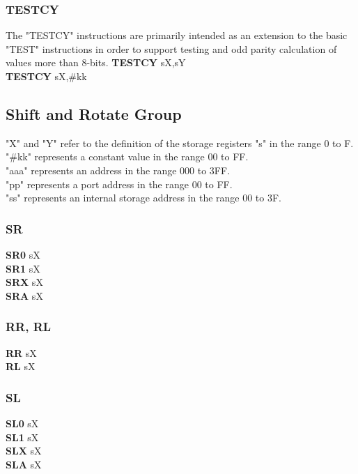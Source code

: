         \subsubsection{TESTCY}
            The "TESTCY" instructions are primarily intended as an extension to the basic "TEST" instructions in order to support testing and odd parity calculation of
            values more than 8-bits.
            \textbf{TESTCY} sX,sY\\
            \textbf{TESTCY} sX,\#kk\\
        \subsection{Shift and Rotate Group}
            "X" and "Y" refer to the definition of the storage registers "s" in the range 0 to F.\\
            "\#kk" represents a constant value in the range 00 to FF.\\
            "aaa" represents an address in the range 000 to 3FF.\\
            "pp" represents a port address in the range 00 to FF.\\
            "ss" represents an internal storage address in the range 00 to 3F.\\
                \subsubsection{SR}
                    \textbf{SR0} sX\\
                    \textbf{SR1} sX\\
                    \textbf{SRX} sX\\
                    \textbf{SRA} sX\\
                \subsubsection{RR, RL}
                    \textbf{RR}  sX\\
                    \textbf{RL}  sX\\
                \subsubsection{SL}
                    \textbf{SL0} sX\\
                    \textbf{SL1} sX\\
                    \textbf{SLX} sX\\
                    \textbf{SLA} sX\\
